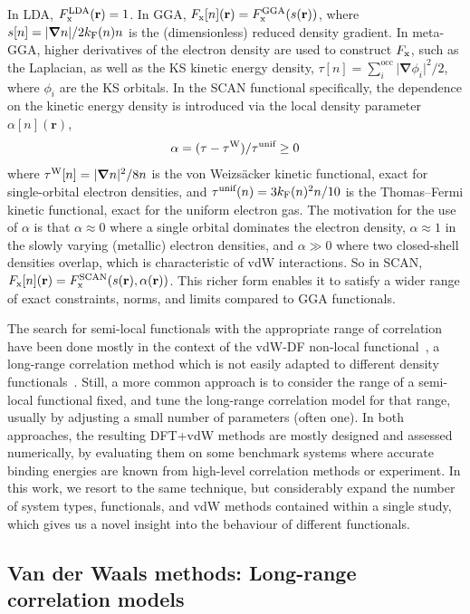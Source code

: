 In LDA, $F^\text{LDA}_\text x(\mathbf r)=1$.
In GGA, $F_\text x[n](\mathbf r)=F^\text{GGA}_\text x(s(\mathbf r))$, where $s[n]=\lvert\boldsymbol\nabla n\rvert/2k_\text F(n)n$ is the (dimensionless) reduced density gradient.
In meta-GGA, higher derivatives of the electron density are used to construct $F_\text x$, such as the Laplacian, as well as the KS kinetic energy density, $\tau[n]=\sum_i^\text{occ}\lvert\boldsymbol\nabla\phi_i\rvert^2/2$, where $\phi_i$ are the KS orbitals.
In the SCAN functional specifically, the dependence on the kinetic energy density is introduced via the local density parameter $\alpha[n](\mathbf r)$,
$$
\alpha=(\tau-\tau^\text W)/\tau^\text{unif}\geq0
$$
where $\tau^\text W[n]=\lvert\boldsymbol\nabla n\rvert^2/8n$ is the von Weizsäcker kinetic functional, exact for single-orbital electron densities, and $\tau^\text{unif}(n)=3k_\text F(n)^2n/10$ is the Thomas--Fermi kinetic functional, exact for the uniform electron gas.
The motivation for the use of $\alpha$ is that $\alpha\approx0$ where a single orbital dominates the electron density, $\alpha\approx1$ in the slowly varying (metallic) electron densities, and $\alpha\gg0$ where two closed-shell densities overlap, which is characteristic of vdW interactions.
So in SCAN, $F_\text x[n](\mathbf r)=F_\text x^\text{SCAN}(s(\mathbf r), \alpha(\mathbf r))$.
This richer form enables it to satisfy a wider range of exact constraints, norms, and limits compared to GGA functionals.

The search for semi-local functionals with the appropriate range of correlation have been done mostly in the context of the vdW-DF non-local functional~\cite{CooperPRB10,PernalPRL09,KlimesJPCM10,KlimesPRB11,HamadaPRB14,WellendorffPRB12,BerlandPRB14}, a long-range correlation method which is not easily adapted to different density functionals~\cite{DionPRL04,LeePRB10}.
Still, a more common approach is to consider the range of a semi-local functional fixed, and tune the long-range correlation model for that range, usually by adjusting a small number of parameters (often one).
In both approaches, the resulting DFT+vdW methods are mostly designed and assessed numerically, by evaluating them on some benchmark systems where accurate binding energies are known from high-level correlation methods or experiment.
In this work, we resort to the same technique, but considerably expand the number of system types, functionals, and vdW methods contained within a single study, which gives us a novel insight into the behaviour of different functionals.
\subsection{Van der Waals methods: Long-range correlation models}

